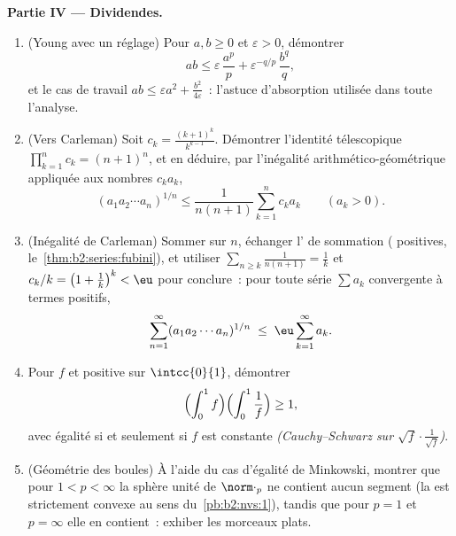 \begin{problem}
\medskip
\noindent\textbf{Partie IV --- Dividendes.}
\begin{enumerate}[resume]
  \item (Young avec un réglage) Pour $a, b \geq 0$ et $\varepsilon >
        0$, démontrer
        \[
        ab \leq \varepsilon\,\frac{a^p}{p} +
        \varepsilon^{-q/p}\,\frac{b^q}{q},
        \]
        et le cas de travail $ab \leq \varepsilon a^2 +
        \frac{b^2}{4\varepsilon}$~: l'astuce d'absorption utilisée
        dans toute l'analyse.
  \item (Vers Carleman) Soit $c_k = \frac{(k+1)^k}{k^{k-1}}$.
        Démontrer l'identité télescopique $\prod_{k=1}^{n}c_k =
        (n+1)^n$, et en déduire, par l'inégalité
        arithmético-géométrique appliquée aux nombres $c_ka_k$,
        \[
        (a_1a_2\cdots a_n)^{1/n} \leq
        \frac{1}{n(n+1)}\sum_{k=1}^{n} c_k a_k
        \qquad (a_k > 0).
        \]
  \item (Inégalité de Carleman) Sommer sur $n$, échanger l'
        de sommation ( positives,
        le~\cref{thm:b2:series:fubini}), et utiliser $\sum_{n \geq
        k}\frac{1}{n(n+1)} = \frac1k$ et $c_k/k = \bigl(1 +
        \frac1k\bigr)^k < \eu$ pour conclure~: pour toute série
        $\sum a_k$ convergente à termes positifs,
        \[
        \sum_{n=1}^{\infty}(a_1a_2\cdots a_n)^{1/n}
        \;\leq\; \eu\sum_{k=1}^{\infty}a_k .
        \]
  \item Pour $f$  et positive sur $\intcc{0}{1}$,
        démontrer
        \[
        \Bigl(\int_0^1 f\Bigr)\Bigl(\int_0^1\frac1f\Bigr)
        \geq 1,
        \]
        avec égalité si et seulement si $f$ est constante
        \emph{(Cauchy--Schwarz sur $\sqrt f\cdot\frac1{\sqrt
        f}$)}.
  \item (Géométrie des boules) À l'aide du cas d'égalité de
        Minkowski, montrer que pour $1 < p < \infty$ la sphère
        unité de $\norm\cdot_p$ ne contient aucun segment (la 
        est strictement convexe au sens du~\cref{pb:b2:nvs:1}),
        tandis que pour $p = 1$ et $p = \infty$ elle en contient~:
        exhiber les morceaux plats.
\end{enumerate}


\end{problem}
